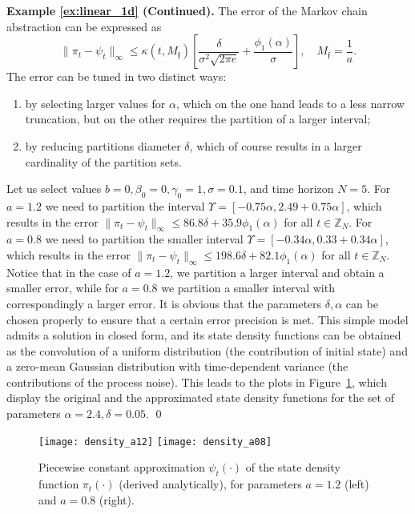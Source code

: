 \documentclass{LMCS}
\begin{document}
\medskip

\noindent\textbf{Example \ref{ex:linear_1d} (Continued).}
The error of the Markov chain abstraction can be expressed as
\begin{equation}
\label{eq:error_example_1}
\|\pi_t-\psi_t\|_\infty
\le \kappa(t,M_{\mathfrak f})\left[\frac{\delta}{\sigma^2\sqrt{2\pi e}}+\frac{\phi_1(\alpha)}{\sigma}\right]
,\quad M_{\mathfrak f} = \frac{1}{a}.
\end{equation}
The error can be tuned in two distinct ways: 
\begin{enumerate}
\item 
by selecting larger values for $\alpha$, 
which on the one hand leads to a less narrow truncation, 
but on the other requires the partition of a larger interval;  
\item 
by reducing partitions diameter $\delta$, which of course results in a larger cardinality of the partition sets.   
\end{enumerate}
Let us select values $b = 0, \beta_0 = 0,\gamma_0 = 1,\sigma = 0.1$, and time horizon $N=5$. 
For $a=1.2$ we need to partition the interval $\Upsilon = \left[-0.75\alpha,2.49+0.75\alpha\right]$, 
which results in the error $\|\pi_t-\psi_t\|_\infty\le 86.8\delta+35.9\phi_1(\alpha)$ for all $t\in\mathbb Z_N$.
For $a = 0.8$ we need to partition the smaller interval
$\Upsilon = \left[-0.34\alpha,0.33+0.34\alpha\right]$, 
which results in the error $\|\pi_t-\psi_t\|_\infty\le 198.6\delta+82.1\phi_1(\alpha)$ for all $t\in\mathbb Z_N$. 
Notice that in the case of $a = 1.2$, 
we partition a larger interval and obtain a smaller error, 
while for $a=0.8$ we partition a smaller interval with correspondingly a larger error. 
It is obvious that the parameters $\delta,\alpha$ can be chosen properly to ensure that a certain error precision is met.
This simple model admits a solution in closed form, 
and its state density functions can be obtained as the convolution of a uniform distribution (the contribution of initial state) and a zero-mean Gaussian distribution with time-dependent variance (the contributions of the process noise). 
This leads to the plots in Figure~\ref{fig:1d_density}, 
which display the original and the approximated state density functions for the set of parameters $\alpha = 2.4,\delta = 0.05$. 
\hfill \qed
\begin{figure}
\centering
\texttt{[image: density\_a12]}
\texttt{[image: density\_a08]}
\caption{Piecewise constant approximation $\psi_t(\cdot)$ of the state density function $\pi_t(\cdot)$ (derived analytically), 
for parameters $a=1.2$ (left) and $a=0.8$ (right).} 
\label{fig:1d_density}
\end{figure}
\end{document}

